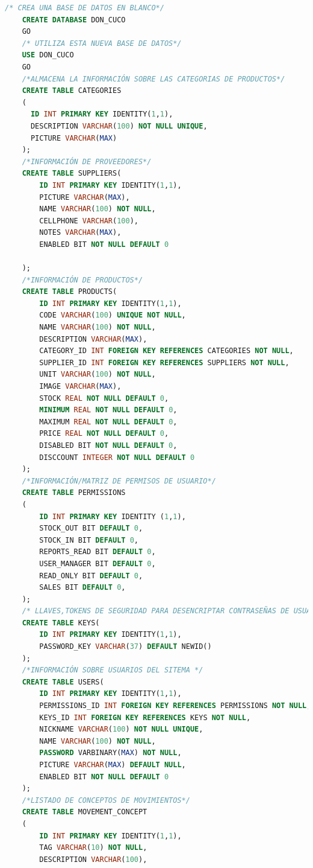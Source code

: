 \documentclass[a4paper,DIV=12]{scrreprt}
\begin{document}
\begin{lstlisting}[language={SQL}]
    /* CREA UNA BASE DE DATOS EN BLANCO*/
    CREATE DATABASE DON_CUCO
    GO
    /* UTILIZA ESTA NUEVA BASE DE DATOS*/
    USE DON_CUCO
    GO
    /*ALMACENA LA INFORMACIÓN SOBRE LAS CATEGORIAS DE PRODUCTOS*/
    CREATE TABLE CATEGORIES
    (
      ID INT PRIMARY KEY IDENTITY(1,1),
      DESCRIPTION VARCHAR(100) NOT NULL UNIQUE,
      PICTURE VARCHAR(MAX)
    );
    /*INFORMACIÓN DE PROVEEDORES*/
    CREATE TABLE SUPPLIERS(
        ID INT PRIMARY KEY IDENTITY(1,1),
        PICTURE VARCHAR(MAX),
        NAME VARCHAR(100) NOT NULL,
        CELLPHONE VARCHAR(100),
        NOTES VARCHAR(MAX),
        ENABLED BIT NOT NULL DEFAULT 0
    
    );
    /*INFORMACIÓN DE PRODUCTOS*/
    CREATE TABLE PRODUCTS(
        ID INT PRIMARY KEY IDENTITY(1,1),
        CODE VARCHAR(100) UNIQUE NOT NULL,
        NAME VARCHAR(100) NOT NULL,
        DESCRIPTION VARCHAR(MAX),
        CATEGORY_ID INT FOREIGN KEY REFERENCES CATEGORIES NOT NULL,
        SUPPLIER_ID INT FOREIGN KEY REFERENCES SUPPLIERS NOT NULL,
        UNIT VARCHAR(100) NOT NULL,
        IMAGE VARCHAR(MAX),
        STOCK REAL NOT NULL DEFAULT 0,
        MINIMUM REAL NOT NULL DEFAULT 0,
        MAXIMUM REAL NOT NULL DEFAULT 0,
        PRICE REAL NOT NULL DEFAULT 0,
        DISABLED BIT NOT NULL DEFAULT 0,
        DISCCOUNT INTEGER NOT NULL DEFAULT 0
    );
    /*INFORMACIÓN/MATRIZ DE PERMISOS DE USUARIO*/
    CREATE TABLE PERMISSIONS
    (
        ID INT PRIMARY KEY IDENTITY (1,1),
        STOCK_OUT BIT DEFAULT 0,
        STOCK_IN BIT DEFAULT 0,
        REPORTS_READ BIT DEFAULT 0,
        USER_MANAGER BIT DEFAULT 0,
        READ_ONLY BIT DEFAULT 0,
        SALES BIT DEFAULT 0,
    );
    /* LLAVES,TOKENS DE SEGURIDAD PARA DESENCRIPTAR CONTRASEÑAS DE USUARIO*/
    CREATE TABLE KEYS(
        ID INT PRIMARY KEY IDENTITY(1,1),
        PASSWORD_KEY VARCHAR(37) DEFAULT NEWID()
    );
    /*INFORMACIÓN SOBRE USUARIOS DEL SITEMA */
    CREATE TABLE USERS(
        ID INT PRIMARY KEY IDENTITY(1,1),
        PERMISSIONS_ID INT FOREIGN KEY REFERENCES PERMISSIONS NOT NULL,
        KEYS_ID INT FOREIGN KEY REFERENCES KEYS NOT NULL,
        NICKNAME VARCHAR(100) NOT NULL UNIQUE,
        NAME VARCHAR(100) NOT NULL,
        PASSWORD VARBINARY(MAX) NOT NULL,
        PICTURE VARCHAR(MAX) DEFAULT NULL,
        ENABLED BIT NOT NULL DEFAULT 0
    );
    /*LISTADO DE CONCEPTOS DE MOVIMIENTOS*/
    CREATE TABLE MOVEMENT_CONCEPT
    (
        ID INT PRIMARY KEY IDENTITY(1,1),
        TAG VARCHAR(10) NOT NULL,
        DESCRIPTION VARCHAR(100),

\end{lstlisting}
\end{document}
